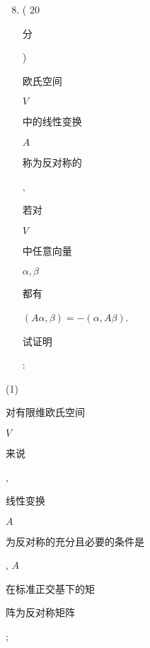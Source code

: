 \documentclass[10pt]{article}
\begin{document}
\begin{enumerate}
  \setcounter{enumi}{7}
  \item ( 20 \begin{CJK}{UTF8}{mj}分\end{CJK}) \begin{CJK}{UTF8}{mj}欧氏空间\end{CJK} $V$ \begin{CJK}{UTF8}{mj}中的线性变换\end{CJK} $A$ \begin{CJK}{UTF8}{mj}称为反对称的\end{CJK}, \begin{CJK}{UTF8}{mj}若对\end{CJK} $V$ \begin{CJK}{UTF8}{mj}中任意向量\end{CJK} $\alpha, \beta$ \begin{CJK}{UTF8}{mj}都有\end{CJK} $(A \alpha, \beta)=-(\alpha, A \beta)$. \begin{CJK}{UTF8}{mj}试证明\end{CJK}:
\end{enumerate}
(1) \begin{CJK}{UTF8}{mj}对有限维欧氏空间\end{CJK} $V$ \begin{CJK}{UTF8}{mj}来说\end{CJK}, \begin{CJK}{UTF8}{mj}线性变换\end{CJK} $A$ \begin{CJK}{UTF8}{mj}为反对称的充分且必要的条件是\end{CJK}, $A$ \begin{CJK}{UTF8}{mj}在标准正交基下的矩\end{CJK} \begin{CJK}{UTF8}{mj}阵为反对称矩阵\end{CJK};
\end{document}
